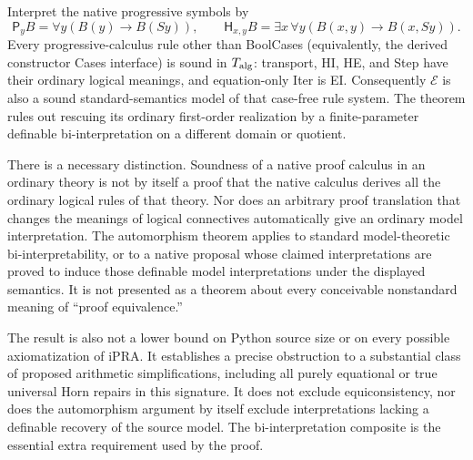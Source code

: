 Interpret the native progressive symbols by
\[
 \mathsf P_yB=\forall y(B(y)\to B(Sy)),\qquad
 \mathsf H_{x,y}B=\exists x\,\forall y(B(x,y)\to B(x,Sy)).
\]
Every progressive-calculus rule other than BoolCases (equivalently,
the derived constructor Cases interface) is sound in
$T_{\rm alg}$: transport, HI, HE, and Step have their ordinary logical
meanings, and equation-only Iter is EI.  Consequently $\mathcal E$
is also a sound standard-semantics model of that case-free rule system.
The theorem rules out rescuing its ordinary first-order realization
by a finite-parameter definable bi-interpretation on a different
domain or quotient.

There is a necessary distinction.  Soundness of a native proof calculus
in an ordinary theory is not by itself a proof that the native calculus
derives all the ordinary logical rules of that theory.  Nor does an
arbitrary proof translation that changes the meanings of logical
connectives automatically give an ordinary model interpretation.
The automorphism theorem applies to standard model-theoretic
bi-interpretability, or to a native proposal whose claimed interpretations
are proved to induce those definable model interpretations under the
displayed semantics.  It is not presented as a theorem about every
conceivable nonstandard meaning of ``proof equivalence.''

The result is also not a lower bound on Python source size or on every
possible axiomatization of iPRA.  It establishes a precise obstruction
to a substantial class of proposed arithmetic simplifications, including
all purely equational or true universal Horn repairs in this signature.
It does not exclude equiconsistency, nor does the automorphism argument
by itself exclude interpretations lacking a definable recovery of the
source model.  The bi-interpretation composite is the essential extra
requirement used by the proof.
